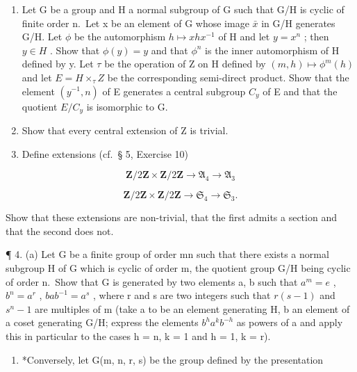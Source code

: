 \BourbakiExercisesSection

\begin{enumerate}
\def\labelenumi{\arabic{enumi}.}
\item
  Let G be a group and H a normal subgroup of G such that G/H is cyclic of finite order n.~Let x be an element of G whose image \(\bar{x}\) in G/H generates G/H. Let \(\phi\) be the automorphism \(h \mapsto xhx^{-1}\) of H and let \(y = x^{n}\) ; then \(y \in H\) . Show that \(\phi(y) = y\) and that \(\phi^{n}\) is the inner automorphism of H defined by y. Let \(\tau\) be the operation of Z on H defined by \((m, h) \mapsto \phi^{m}(h)\) and let \(E = H \times_{\tau} Z\) be the corresponding semi-direct product. Show that the element \((y^{-1}, n)\) of E generates a central subgroup \(C_{y}\) of E and that the quotient \(E/C_{y}\) is isomorphic to G.
\item
  Show that every central extension of Z is trivial.
\item
  Define extensions (cf.~§ 5, Exercise 10)
\end{enumerate}

\[
\mathbf {Z} / 2 \mathbf {Z} \times \mathbf {Z} / 2 \mathbf {Z} \rightarrow \mathfrak {A} _ {4} \rightarrow \mathfrak {A} _ {3}
\]

\[
\mathbf {Z} / 2 \mathbf {Z} \times \mathbf {Z} / 2 \mathbf {Z} \rightarrow \mathfrak {S} _ {4} \rightarrow \mathfrak {S} _ {3}.
\]

Show that these extensions are non-trivial, that the first admits a section and that the second does not.

¶ 4. (a) Let G be a finite group of order mn such that there exists a normal subgroup H of G which is cyclic of order m, the quotient group G/H being cyclic of order n.~Show that G is generated by two elements a, b such that \(a^{m} = e\) , \(b^{n} = a^{r}\) , \(bab^{-1} = a^{s}\) , where r and s are two integers such that \(r(s - 1)\) and \(s^{n} - 1\) are multiples of m (take a to be an element generating H, b an element of a coset generating G/H; express the elements \(b^{h}a^{k}b^{-h}\) as powers of a and apply this in particular to the cases h = n, k = 1 and h = 1, k = r).

\begin{enumerate}
\def\labelenumi{(\alph{enumi})}
\setcounter{enumi}{1}
\tightlist
\item
  *Conversely, let G(m, n, r, s) be the group defined by the presentation
\end{enumerate}

